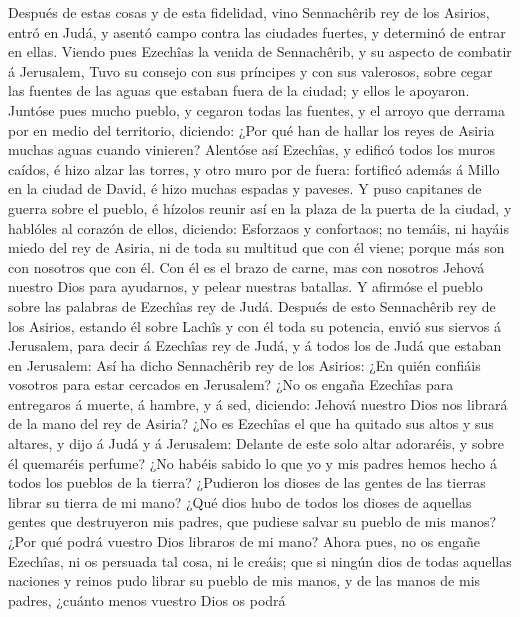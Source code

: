  Después de estas cosas y de esta fidelidad, vino
Sennachêrib rey de los Asirios, entró en Judá, y asentó campo contra las
ciudades fuertes, y determinó de entrar en ellas.  Viendo
pues Ezechîas la venida de Sennachêrib, y su aspecto de combatir á
Jerusalem,  Tuvo su consejo con sus príncipes y con sus
valerosos, sobre cegar las fuentes de las aguas que estaban fuera de la
ciudad; y ellos le apoyaron.  Juntóse pues mucho pueblo, y
cegaron todas las fuentes, y el arroyo que derrama por en medio del
territorio, diciendo: ¿Por qué han de hallar los reyes de Asiria muchas
aguas cuando vinieren?  Alentóse así Ezechîas, y edificó
todos los muros caídos, é hizo alzar las torres, y otro muro por de
fuera: fortificó además á Millo en la ciudad de David, é hizo muchas
espadas y paveses.  Y puso capitanes de guerra sobre el
pueblo, é hízolos reunir así en la plaza de la puerta de la ciudad, y
hablóles al corazón de ellos, diciendo:  Esforzaos y
confortaos; no temáis, ni hayáis miedo del rey de Asiria, ni de toda su
multitud que con él viene; porque más son con nosotros que con él.
 Con él es el brazo de carne, mas con nosotros Jehová
nuestro Dios para ayudarnos, y pelear nuestras batallas. Y afirmóse el
pueblo sobre las palabras de Ezechîas rey de Judá.  Después
de esto Sennachêrib rey de los Asirios, estando él sobre Lachîs y con él
toda su potencia, envió sus siervos á Jerusalem, para decir á Ezechîas
rey de Judá, y á todos los de Judá que estaban en Jerusalem:
 Así ha dicho Sennachêrib rey de los Asirios: ¿En quién
confiáis vosotros para estar cercados en Jerusalem?  ¿No os
engaña Ezechîas para entregaros á muerte, á hambre, y á sed, diciendo:
Jehová nuestro Dios nos librará de la mano del rey de Asiria?
 ¿No es Ezechîas el que ha quitado sus altos y sus altares,
y dijo á Judá y á Jerusalem: Delante de este solo altar adoraréis, y
sobre él quemaréis perfume?  ¿No habéis sabido lo que yo y
mis padres hemos hecho á todos los pueblos de la tierra? ¿Pudieron los
dioses de las gentes de las tierras librar su tierra de mi mano?
 ¿Qué dios hubo de todos los dioses de aquellas gentes que
destruyeron mis padres, que pudiese salvar su pueblo de mis manos? ¿Por
qué podrá vuestro Dios libraros de mi mano?  Ahora pues, no
os engañe Ezechîas, ni os persuada tal cosa, ni le creáis; que si ningún
dios de todas aquellas naciones y reinos pudo librar su pueblo de mis
manos, y de las manos de mis padres, ¿cuánto menos vuestro Dios os podrá
